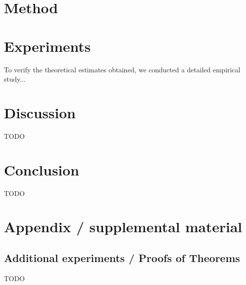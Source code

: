 \documentclass{article}
\begin{document}
\section{Method}\label{sec:method}

\section{Experiments}\label{sec:exp}

To verify the theoretical estimates obtained, we conducted a detailed empirical study...

\section{Discussion}\label{sec:disc}

TODO

\section{Conclusion}\label{sec:concl}

TODO







\newpage
\appendix
\section{Appendix / supplemental material}\label{app}

\subsection{Additional experiments / Proofs of Theorems}\label{app:exp}

TODO
\end{document}
